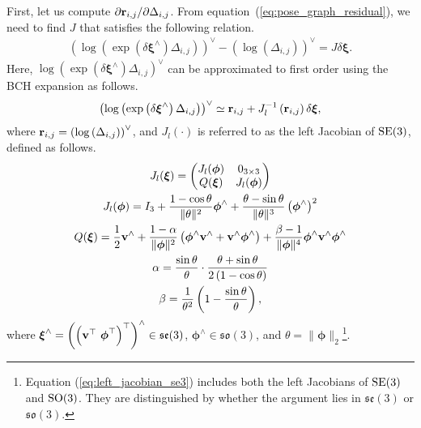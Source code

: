 First, let us compute $\partial {\bf r}_{i, j} / \partial \Delta_{i, j}$.
From equation~(\ref{eq:pose_graph_residual}), we need to find $J$ that satisfies the following relation.
%
\begin{align}
  \left( \log \left( \exp \left( \delta \boldsymbol \xi^{\wedge} \right) \Delta_{i, j} \right) \right)^{\vee} - \left( \log \left( \Delta_{i, j} \right) \right)^{\vee} = J \delta \boldsymbol \xi.
  \label{eq:deij_dDeltaij_J_deltaxi}
\end{align}
%
Here, $\log \left( \exp \left( \delta \boldsymbol \xi^{\wedge} \right) \Delta_{i, j} \right)^{\vee}$ can be approximated to first order using the BCH expansion as follows.
%
\begin{align}
  \left( \log \left( \exp \left( \delta \boldsymbol \xi^{\wedge} \right) \Delta_{i, j} \right) \right)^{\vee}
  \simeq {\bf r}_{i, j} + J_{l}^{-1} \left( {\bf r}_{i, j} \right) \delta \boldsymbol \xi,
  \label{eq:bch_1_order_approx}
\end{align}
%
where ${\bf r}_{i, j} = \left( \log \left( \Delta_{i, j} \right) \right)^{\vee}$, and $J_{l}(\cdot)$ is referred to as the left Jacobian of ${\rm SE}(3)$, defined as follows.
%
\begin{align}
  \begin{gathered}
    J_{l}( \boldsymbol \xi )
    = \left( \begin{matrix}
        J_{l}( \boldsymbol \phi ) & 0_{3 \times 3} \\
        Q( \boldsymbol \xi )      & J_{l}( \boldsymbol \phi ) \\
      \end{matrix} \right) \\
%
    J_{l}( \boldsymbol \phi ) = I_{3}
                              + \frac{ 1 - \cos \theta }{ \| \theta \|^{2} } \boldsymbol \phi^{\wedge}
                              + \frac{ \theta - \sin \theta }{ \| \theta \|^{3} } \left( \boldsymbol \phi^{\wedge} \right)^{2} \\
%
    Q( \boldsymbol \xi ) = \frac{1}{2} {\bf v}^{\wedge}
                         + \frac{1 - \alpha}{ \|\boldsymbol \phi \|^{2} } \left( \boldsymbol \phi^{\wedge} {\bf v}^{\wedge} + {\bf v}^{\wedge} \boldsymbol \phi^{\wedge} \right)
                         + \frac{\beta - 1}{ \|\boldsymbol \phi \|^{4} } \boldsymbol \phi^{\wedge} {\bf v}^{\wedge} \boldsymbol \phi^{\wedge} \\
%
    \alpha = \frac{ \sin \theta }{ \theta } \cdot \frac{ \theta + \sin \theta }{ 2 \left( 1 - \cos \theta \right) } \\
%
    \beta = \frac{1}{ \theta^{2} } \left( 1 - \frac{ \sin \theta }{ \theta } \right),
  \end{gathered}
  \label{eq:left_jacobian_se3}
\end{align}
%
where $\boldsymbol \xi^{\wedge} = \left( \left( {\bf v}^{\top} ~ \boldsymbol \phi^{\top} \right)^{\top} \right)^{\wedge} \in \mathfrak{se}(3)$, $\boldsymbol \phi^{\wedge} \in \mathfrak{so}(3)$, and $\theta = \| \boldsymbol \phi \|_{2}$\footnote{Equation (\ref{eq:left_jacobian_se3}) includes both the left Jacobians of ${\rm SE}(3)$ and ${\rm SO}(3)$. They are distinguished by whether the argument lies in $\mathfrak{se}(3)$ or $\mathfrak{so}(3)$.}.

